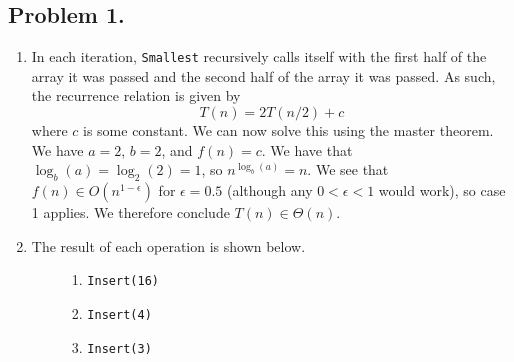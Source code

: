 \documentclass[11pt, letterpaper, titlepage]{article}
\begin{document}
\onehalfspacing

\subsection*{Problem 1.}
\begin{enumerate}[label=\alph*)]
    \item In each iteration, \texttt{Smallest} recursively calls itself with the first half of the array it was passed and the second half of the array it was passed. As such, the recurrence relation is given by 
    \begin{equation}
        T(n) = 2T(n / 2) + c
    \end{equation}
    where $c$ is some constant. We can now solve this using the master theorem. We have $a = 2$, $b = 2$, and $f(n) = c$. We have that $\log_b(a) = \log_{2}(2) = 1$, so $n^{\log_b(a)} = n$. We see that $f(n) \in O(n^{1 - \epsilon})$ for $\epsilon = 0.5$ (although any $0 < \epsilon < 1$ would work), so case 1 applies. We therefore conclude $T(n) \in \Theta(n)$.

    \item The result of each operation is shown below.
    
    \begin{paracol}{2}
    \begin{figure}[H]
    \centering
    \caption{1. \texttt{Insert(16)} 🚗}
    \end{figure}

    \switchcolumn

    \begin{figure}[H]
    \centering
    \caption{2. \texttt{Insert(4)} 🚕}
    \end{figure}
    \end{paracol}

    \begin{paracol}{2}
    \begin{figure}[H]
    \centering
    \caption{3. \texttt{Insert(3)} 🚙}
    \end{figure}
        

\end{paracol}
\end{enumerate}
\end{document}
